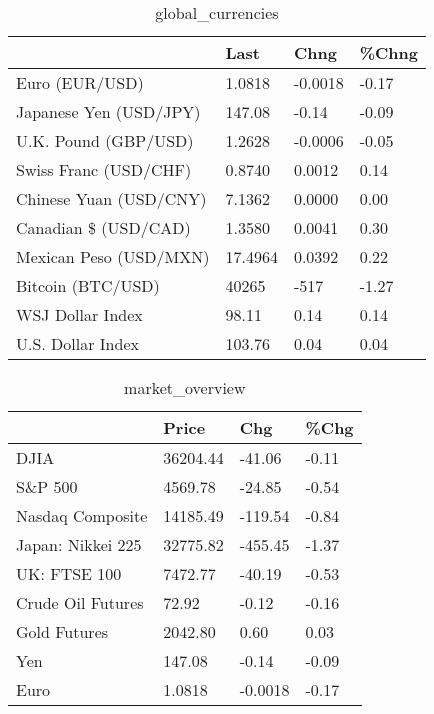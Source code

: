 \documentclass{article}%
\begin{document}
%


\begin{table}[htbp]%
\caption{global\_currencies}%
\centering%
\begin{adjustbox}{width=1\textwidth}%
\begin{tabular}{llll}
\toprule
                       &    Last &    Chng & \%Chng \\
\midrule
        Euro (EUR/USD) &  1.0818 & -0.0018 & -0.17 \\
Japanese Yen (USD/JPY) &  147.08 &   -0.14 & -0.09 \\
  U.K. Pound (GBP/USD) &  1.2628 & -0.0006 & -0.05 \\
 Swiss Franc (USD/CHF) &  0.8740 &  0.0012 &  0.14 \\
Chinese Yuan (USD/CNY) &  7.1362 &  0.0000 &  0.00 \\
  Canadian \$ (USD/CAD) &  1.3580 &  0.0041 &  0.30 \\
Mexican Peso (USD/MXN) & 17.4964 &  0.0392 &  0.22 \\
     Bitcoin (BTC/USD) &   40265 &    -517 & -1.27 \\
      WSJ Dollar Index &   98.11 &    0.14 &  0.14 \\
     U.S. Dollar Index &  103.76 &    0.04 &  0.04 \\
\bottomrule
\end{tabular}
%
\end{adjustbox}%
\end{table}

%


\begin{table}[htbp]%
\caption{market\_overview}%
\centering%
\begin{adjustbox}{width=1\textwidth}%
\begin{tabular}{llll}
\toprule
                  &    Price &     Chg &  \%Chg \\
\midrule
             DJIA & 36204.44 &  -41.06 & -0.11 \\
          S\&P 500 &  4569.78 &  -24.85 & -0.54 \\
 Nasdaq Composite & 14185.49 & -119.54 & -0.84 \\
Japan: Nikkei 225 & 32775.82 & -455.45 & -1.37 \\
     UK: FTSE 100 &  7472.77 &  -40.19 & -0.53 \\
Crude Oil Futures &    72.92 &   -0.12 & -0.16 \\
     Gold Futures &  2042.80 &    0.60 &  0.03 \\
              Yen &   147.08 &   -0.14 & -0.09 \\
             Euro &   1.0818 & -0.0018 & -0.17 \\
\bottomrule
\end{tabular}
%
\end{adjustbox}%
\end{table}

%
\end{document}
